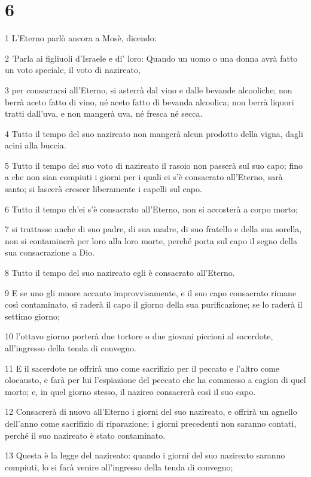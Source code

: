 \chapter{6}

\par 1 L'Eterno parlò ancora a Mosè, dicendo:
\par 2 'Parla ai figliuoli d'Israele e di' loro: Quando un uomo o una donna avrà fatto un voto speciale, il voto di nazireato,
\par 3 per consacrarsi all'Eterno, si asterrà dal vino e dalle bevande alcooliche; non berrà aceto fatto di vino, né aceto fatto di bevanda alcoolica; non berrà liquori tratti dall'uva, e non mangerà uva, né fresca né secca.
\par 4 Tutto il tempo del suo nazireato non mangerà alcun prodotto della vigna, dagli acini alla buccia.
\par 5 Tutto il tempo del suo voto di nazireato il rasoio non passerà sul suo capo; fino a che non sian compiuti i giorni per i quali ei s'è consacrato all'Eterno, sarà santo; si lascerà crescer liberamente i capelli sul capo.
\par 6 Tutto il tempo ch'ei s'è consacrato all'Eterno, non si accosterà a corpo morto;
\par 7 si trattasse anche di suo padre, di sua madre, di suo fratello e della sua sorella, non si contaminerà per loro alla loro morte, perché porta sul capo il segno della sua consacrazione a Dio.
\par 8 Tutto il tempo del suo nazireato egli è consacrato all'Eterno.
\par 9 E se uno gli muore accanto improvvisamente, e il suo capo consacrato rimane così contaminato, si raderà il capo il giorno della sua purificazione; se lo raderà il settimo giorno;
\par 10 l'ottavo giorno porterà due tortore o due giovani piccioni al sacerdote, all'ingresso della tenda di convegno.
\par 11 E il sacerdote ne offrirà uno come sacrifizio per il peccato e l'altro come olocausto, e farà per lui l'espiazione del peccato che ha commesso a cagion di quel morto; e, in quel giorno stesso, il nazireo consacrerà così il suo capo.
\par 12 Consacrerà di nuovo all'Eterno i giorni del suo nazireato, e offrirà un agnello dell'anno come sacrifizio di riparazione; i giorni precedenti non saranno contati, perché il suo nazireato è stato contaminato.
\par 13 Questa è la legge del nazireato: quando i giorni del suo nazireato saranno compiuti, lo si farà venire all'ingresso della tenda di convegno;
